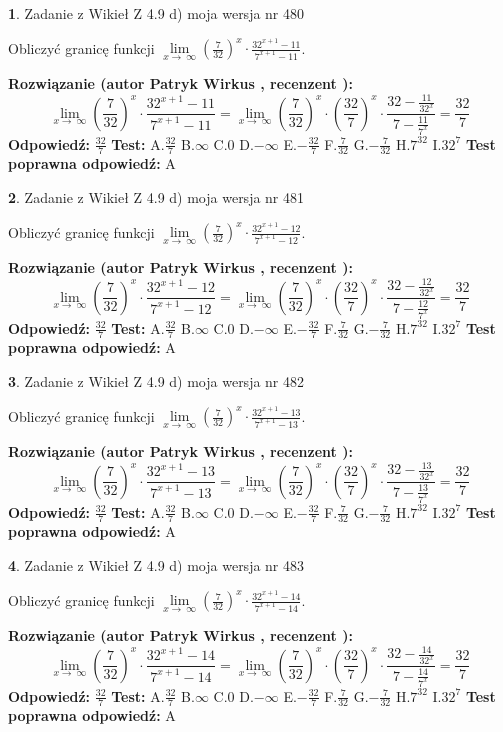 \documentclass[12pt, a4paper]{article}
\theoremstyle{definition} %
\newtheorem{zad}{}
\newcommand{\zadStart}[1]{\begin{zad}#1\newline}
\newcommand{\zadStop}{\end{zad}}
\newcommand{\rozwStart}[2]{\noindent \textbf{Rozwiązanie (autor #1 , recenzent #2): }\newline}
\newcommand{\rozwStop}{\newline}
\newcommand{\odpStart}{\noindent \textbf{Odpowiedź:}\newline}
\newcommand{\odpStop}{\newline}
\newcommand{\testStart}{\noindent \textbf{Test:}\newline}
\newcommand{\testStop}{\newline}
\newcommand{\kluczStart}{\noindent \textbf{Test poprawna odpowiedź:}\newline}
\newcommand{\kluczStop}{\newline}
\begin{document}
\zadStart{Zadanie z Wikieł Z 4.9 d) moja wersja nr 480}


Obliczyć granicę funkcji  $\lim\limits_{x\to\ \infty}(\frac{7}{32})^{x}\cdot\frac{32^{x+1}-11}{7^{x+1}-11}$.
\zadStop
\rozwStart{Patryk Wirkus}{}
$$\lim\limits_{x\to\ \infty}(\frac{7}{32})^{x}\cdot\frac{32^{x+1}-11}{7^{x+1}-11}=\lim\limits_{x\to\ \infty}(\frac{7}{32})^{x}\cdot(\frac{32}{7})^{x} \cdot \frac{32-\frac{11}{32^{x}}}{7-\frac{11}{7^{x}}} = \frac{32}{7}$$
\rozwStop
\odpStart
$\frac{32}{7}$
\odpStop
\testStart
A.$\frac{32}{7}$ B.$\infty$ C.$0$ D.$-\infty$ E.$-\frac{32}{7}$
F.$\frac{7}{32}$ G.$-\frac{7}{32}$
H.$7^{32}$
I.$32^{7}$
\testStop
\kluczStart
A
\kluczStop



\zadStart{Zadanie z Wikieł Z 4.9 d) moja wersja nr 481}


Obliczyć granicę funkcji  $\lim\limits_{x\to\ \infty}(\frac{7}{32})^{x}\cdot\frac{32^{x+1}-12}{7^{x+1}-12}$.
\zadStop
\rozwStart{Patryk Wirkus}{}
$$\lim\limits_{x\to\ \infty}(\frac{7}{32})^{x}\cdot\frac{32^{x+1}-12}{7^{x+1}-12}=\lim\limits_{x\to\ \infty}(\frac{7}{32})^{x}\cdot(\frac{32}{7})^{x} \cdot \frac{32-\frac{12}{32^{x}}}{7-\frac{12}{7^{x}}} = \frac{32}{7}$$
\rozwStop
\odpStart
$\frac{32}{7}$
\odpStop
\testStart
A.$\frac{32}{7}$ B.$\infty$ C.$0$ D.$-\infty$ E.$-\frac{32}{7}$
F.$\frac{7}{32}$ G.$-\frac{7}{32}$
H.$7^{32}$
I.$32^{7}$
\testStop
\kluczStart
A
\kluczStop



\zadStart{Zadanie z Wikieł Z 4.9 d) moja wersja nr 482}


Obliczyć granicę funkcji  $\lim\limits_{x\to\ \infty}(\frac{7}{32})^{x}\cdot\frac{32^{x+1}-13}{7^{x+1}-13}$.
\zadStop
\rozwStart{Patryk Wirkus}{}
$$\lim\limits_{x\to\ \infty}(\frac{7}{32})^{x}\cdot\frac{32^{x+1}-13}{7^{x+1}-13}=\lim\limits_{x\to\ \infty}(\frac{7}{32})^{x}\cdot(\frac{32}{7})^{x} \cdot \frac{32-\frac{13}{32^{x}}}{7-\frac{13}{7^{x}}} = \frac{32}{7}$$
\rozwStop
\odpStart
$\frac{32}{7}$
\odpStop
\testStart
A.$\frac{32}{7}$ B.$\infty$ C.$0$ D.$-\infty$ E.$-\frac{32}{7}$
F.$\frac{7}{32}$ G.$-\frac{7}{32}$
H.$7^{32}$
I.$32^{7}$
\testStop
\kluczStart
A
\kluczStop



\zadStart{Zadanie z Wikieł Z 4.9 d) moja wersja nr 483}


Obliczyć granicę funkcji  $\lim\limits_{x\to\ \infty}(\frac{7}{32})^{x}\cdot\frac{32^{x+1}-14}{7^{x+1}-14}$.
\zadStop
\rozwStart{Patryk Wirkus}{}
$$\lim\limits_{x\to\ \infty}(\frac{7}{32})^{x}\cdot\frac{32^{x+1}-14}{7^{x+1}-14}=\lim\limits_{x\to\ \infty}(\frac{7}{32})^{x}\cdot(\frac{32}{7})^{x} \cdot \frac{32-\frac{14}{32^{x}}}{7-\frac{14}{7^{x}}} = \frac{32}{7}$$
\rozwStop
\odpStart
$\frac{32}{7}$
\odpStop
\testStart
A.$\frac{32}{7}$ B.$\infty$ C.$0$ D.$-\infty$ E.$-\frac{32}{7}$
F.$\frac{7}{32}$ G.$-\frac{7}{32}$
H.$7^{32}$
I.$32^{7}$
\testStop
\kluczStart
A
\kluczStop
\end{document}

